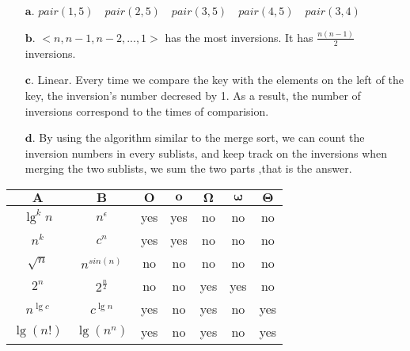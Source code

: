 \documentclass[a4paper, justified]{tufte-handout}
\begin{document}
\begin{problem}[TC Problem $2-4$]
\end{problem}

\begin{solution}
\begin{enumerate}
    \item [$\bm{a.}$] $pair(1,5)\quad pair(2,5)\quad pair(3,5)\quad pair(4,5)\quad pair(3,4)$
    \item [$\bm{b.}$]  $<n,n-1,n-2,...,1>$ has the most inversions. It has $\frac{n(n-1)}{2}$ inversions.
    \item [$\bm{c.}$] Linear. Every time we compare the key with the elements on the left of the key, the inversion's number decresed by 1. As a result, the number of inversions correspond to the times of comparision.
    \item [$\bm{d.}$] By using the algorithm similar to the merge sort, we can count the inversion numbers in every sublists, and keep track on the inversions when merging the two sublists, we sum the two parts ,that is the answer.
\end{enumerate}
\end{solution}

\begin{problem}[TC Problem $3-2$]
\end{problem}

\begin{solution}
  \begin{tabular}[t]{cc|c|c|c|c|c|}
    $\bm{A}$ & $\bm{B}$ & $\bm{O}$ & $\bm{o}$ & $\bm{\Omega}$ & $\bm{\omega}$ & $\bm{\Theta}$\\
    \hline
    $\lg^{k}n$ & $n^{\epsilon}$ &yes &yes &no &no &no\\
    \hline
    $n^{k}$ & $c^{n} $ &yes &yes& no& no&no\\
    \hline
    $\sqrt{n}$ & $n^{sin(n)}$ &no &no &no &no &no\\
    \hline 
    $2^{n} $& $2^{\frac{n}{2}}$ & no &no &yes &yes &no \\
    \hline
    $n^{\lg c}$ & $c^{\lg n}$ &yes &no &yes &no &yes\\
    \hline
    $\lg{(n!)}$ & $\lg(n^{n})$ & yes &no &yes &no &yes\\
    \hline

\end{tabular}
\end{solution}


\begin{problem}[TC Problem $3-4$]
\end{problem}
\end{document}
